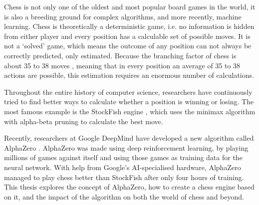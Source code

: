 \documentclass{article}
\begin{document}

Chess is not only one of the oldest and most popular board games in the world, it is also a breeding ground for
complex algorithms, and more recently, machine learning. Chess is theoretically a deterministic game, i.e.
no information is hidden from either player and every position has a calculable set of possible moves.
It is not a `solved' game, which means the outcome of any position can not always be correctly predicted, only estimated. 
Because the branching factor of chess is about 35 to 38 moves \cite{BranchingFactorChessprogramming}, 
meaning that in every position an average of 35 to 38 actions are possible, 
this estimation requires an enormous number of calculations.

Throughout the entire history of computer science, researchers have continuously tried to find better
ways to calculate whether a position is winning or losing. The most famous example is the StockFish 
engine \cite{StockfishChess2022}, which uses the minimax algorithm with alpha-beta pruning to calculate the best move.

Recently, researchers at Google DeepMind have developed a new algorithm called AlphaZero \cite{AlphaZero2022}.
AlphaZero was made using deep reinforcement learning, by playing millions of games against itself and 
using those games as training data for the neural network. With help from Google's AI-specialised hardware,
AlphaZero managed to play chess better than StockFish after only four hours of training.
This thesis explores the concept of AlphaZero, how to create a chess engine based on it, and the impact of 
the algorithm on both the world of chess and beyond.
\end{document}
